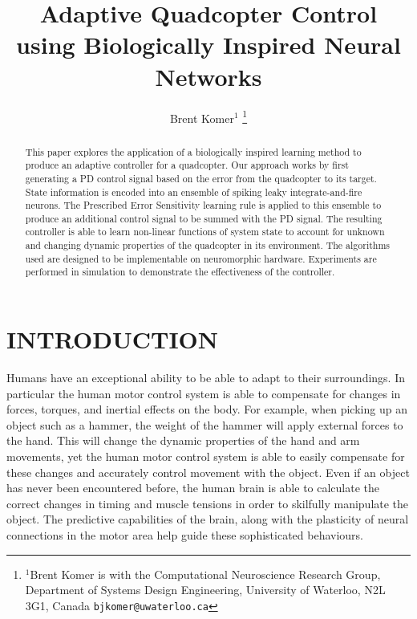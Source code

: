 \documentclass[letterpaper, 10 pt, conference]{ieeeconf}  %
\title{\LARGE \bf
Adaptive Quadcopter Control using Biologically Inspired Neural Networks
}
\author{Brent Komer$^{1}$%
\thanks{$^{1}$Brent Komer is with the Computational Neuroscience Research Group, Department of Systems Design Engineering,
        University of Waterloo, N2L 3G1, Canada
        {\tt\small bjkomer@uwaterloo.ca}}%
}
\begin{document}
\maketitle
\thispagestyle{empty}
\pagestyle{empty}


\begin{abstract}

This paper explores the application of a biologically inspired learning method to produce an adaptive controller for a quadcopter.
Our approach works by first generating a PD control signal based on the error from the quadcopter to its target.
State information is encoded into an ensemble of spiking leaky integrate-and-fire neurons.
The Prescribed Error Sensitivity learning rule is applied to this ensemble to produce an additional control signal to be summed with the PD signal.
The resulting controller is able to learn non-linear functions of system state to account for unknown and changing dynamic properties of the quadcopter in its environment.
The algorithms used are designed to be implementable on neuromorphic hardware.
Experiments are performed in simulation to demonstrate the effectiveness of the controller.

\end{abstract}


\section{INTRODUCTION}

Humans have an exceptional ability to be able to adapt to their surroundings.
In particular the human motor control system is able to compensate for changes in forces, torques, and inertial effects on the body.
For example, when picking up an object such as a hammer, the weight of the hammer will apply external forces to the hand.
This will change the dynamic properties of the hand and arm movements, yet the human motor control system is able to easily compensate for these changes and accurately control movement with the object.
Even if an object has never been encountered before, the human brain is able to calculate the correct changes in timing and muscle tensions in order to skilfully manipulate the object.
The predictive capabilities of the brain, along with the plasticity of neural connections in the motor area help guide these sophisticated behaviours.
\end{document}
